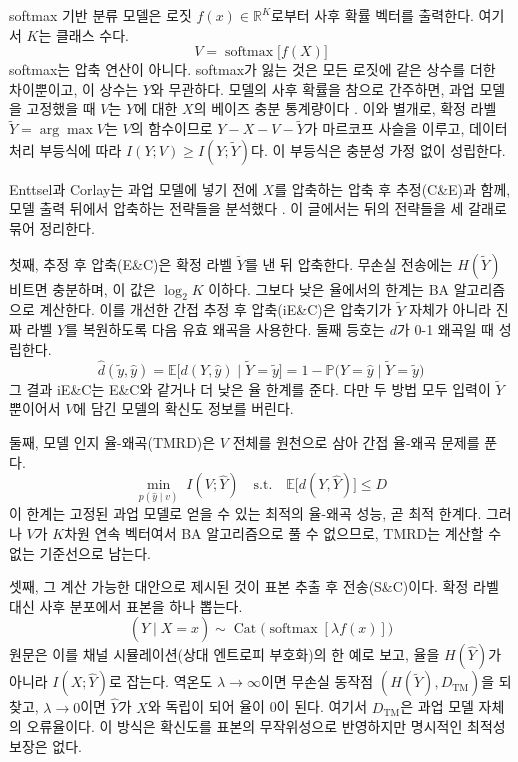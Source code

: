 \documentclass[11pt,a4paper]{article}
\newcommand{\E}{\mathbb{E}}
\renewcommand{\P}{\mathbb{P}}
\newcommand{\I}{I}
\newcommand{\Yt}{\tilde{Y}}
\newcommand{\Yh}{\hat{Y}}
\newcommand{\softmax}{\operatorname{softmax}}
\newcommand{\Cat}{\operatorname{Cat}}
\begin{document}
softmax 기반 분류 모델은 로짓 $f(x)\in\mathbb{R}^{K}$로부터 사후 확률 벡터를 출력한다. 여기서 $K$는 클래스 수다.
\begin{equation}
V = \softmax\bigl[f(X)\bigr]
\label{eq:v}
\end{equation}
softmax는 압축 연산이 아니다. softmax가 잃는 것은 모든 로짓에 같은 상수를 더한 차이뿐이고, 이 상수는 $Y$와 무관하다. 모델의 사후 확률을 참으로 간주하면, 과업 모델을 고정했을 때 $V$는 $Y$에 대한 $X$의 베이즈 충분 통계량이다 \cite{enttsel2026}. 이와 별개로, 확정 라벨 $\Yt=\arg\max V$는 $V$의 함수이므로 $Y - X - V - \Yt$가 마르코프 사슬을 이루고, 데이터 처리 부등식에 따라 $\I(Y;V)\ge \I(Y;\Yt)$다. 이 부등식은 충분성 가정 없이 성립한다.

Enttsel과 Corlay는 과업 모델에 넣기 전에 $X$를 압축하는 압축 후 추정(C\&E)과 함께, 모델 출력 뒤에서 압축하는 전략들을 분석했다 \cite{enttsel2026}. 이 글에서는 뒤의 전략들을 세 갈래로 묶어 정리한다.

첫째, 추정 후 압축(E\&C)은 확정 라벨 $\Yt$를 낸 뒤 압축한다. 무손실 전송에는 $H(\Yt)$ 비트면 충분하며, 이 값은 $\log_2 K$ 이하다. 그보다 낮은 율에서의 한계는 BA 알고리즘으로 계산한다. 이를 개선한 간접 추정 후 압축(iE\&C)은 압축기가 $\Yt$ 자체가 아니라 진짜 라벨 $Y$를 복원하도록 다음 유효 왜곡을 사용한다. 둘째 등호는 $d$가 0-1 왜곡일 때 성립한다.
\begin{equation}
\hat d(\tilde y,\hat y) = \E\bigl[d(Y,\hat y)\mid \Yt=\tilde y\bigr] = 1 - \P\bigl(Y=\hat y\mid \Yt=\tilde y\bigr)
\end{equation}
그 결과 iE\&C는 E\&C와 같거나 더 낮은 율 한계를 준다. 다만 두 방법 모두 입력이 $\Yt$뿐이어서 $V$에 담긴 모델의 확신도 정보를 버린다.

둘째, 모델 인지 율-왜곡(TMRD)은 $V$ 전체를 원천으로 삼아 간접 율-왜곡 문제를 푼다.
\begin{equation}
\min_{p(\hat y\mid v)}\; \I(V;\Yh) \quad \text{s.t.} \quad \E\bigl[d(Y,\Yh)\bigr]\le D
\end{equation}
이 한계는 고정된 과업 모델로 얻을 수 있는 최적의 율-왜곡 성능, 곧 최적 한계다. 그러나 $V$가 $K$차원 연속 벡터여서 BA 알고리즘으로 풀 수 없으므로, TMRD는 계산할 수 없는 기준선으로 남는다.

셋째, 그 계산 가능한 대안으로 제시된 것이 표본 추출 후 전송(S\&C)이다. 확정 라벨 대신 사후 분포에서 표본을 하나 뽑는다.
\begin{equation}
(\Yh\mid X=x) \sim \Cat\bigl(\softmax[\lambda f(x)]\bigr)
\end{equation}
원문은 이를 채널 시뮬레이션(상대 엔트로피 부호화)의 한 예로 보고, 율을 $H(\Yh)$가 아니라 $\I(X;\Yh)$로 잡는다. 역온도 $\lambda\to\infty$이면 무손실 동작점 $(H(\Yt), D_{\mathrm{TM}})$을 되찾고, $\lambda\to0$이면 $\Yh$가 $X$와 독립이 되어 율이 0이 된다. 여기서 $D_{\mathrm{TM}}$은 과업 모델 자체의 오류율이다. 이 방식은 확신도를 표본의 무작위성으로 반영하지만 명시적인 최적성 보장은 없다.
\end{document}
